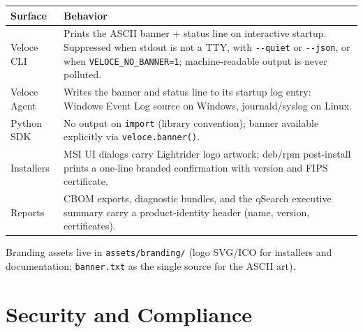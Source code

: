 \documentclass[10pt]{article}
\newcommand{\code}[1]{\texttt{\small #1}}
\begin{document}
\begin{small}
\begin{tabularx}{\textwidth}{@{}lL@{}}
\toprule
\textbf{Surface} & \textbf{Behavior} \\
\midrule
Veloce CLI & Prints the ASCII banner + status line on interactive startup. Suppressed
  when stdout is not a TTY, with \code{-{}-quiet} or \code{-{}-json}, or when
  \code{VELOCE\_NO\_BANNER=1}; machine-readable output is never polluted. \\
Veloce Agent & Writes the banner and status line to its startup log entry: Windows
  Event Log source on Windows, journald/syslog on Linux. \\
Python SDK & No output on \code{import} (library convention); banner available
  explicitly via \code{veloce.banner()}. \\
Installers & MSI UI dialogs carry Lightrider logo artwork; deb/rpm post-install prints a
  one-line branded confirmation with version and FIPS certificate. \\
Reports & CBOM exports, diagnostic bundles, and the qSearch executive summary carry a
  product-identity header (name, version, certificates). \\
\bottomrule
\end{tabularx}
\end{small}

Branding assets live in \code{assets/branding/} (logo SVG/ICO for installers and
documentation; \code{banner.txt} as the single source for the ASCII art).

\section{Security and Compliance}\label{sec:security}
\end{document}

